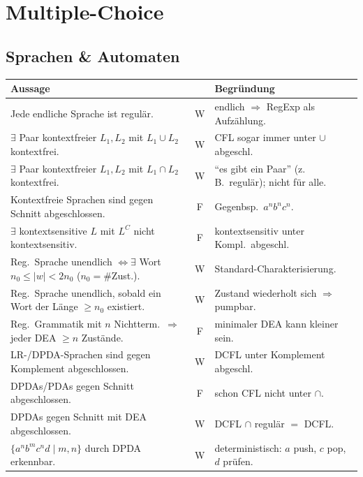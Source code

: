 \section{Multiple-Choice}\label{subsec:multiple-choice}

\subsection{Sprachen \& Automaten}
\begin{mytable}
    \begin{tabular}{@{}p{} c p{}@{}}
        \hline
        \textbf{Aussage} & \textbf{} & \textbf{Begründung}\\
        \hline
        Jede endliche Sprache ist regulär.
        & W & endlich $\Rightarrow$ RegExp als Aufzählung.\\
        $\exists$ Paar kontextfreier $L_1,L_2$ mit $L_1\cup L_2$ kontextfrei.
        & W & CFL sogar immer unter $\cup$
        abgeschl.\\
        $\exists$ Paar kontextfreier $L_1,L_2$ mit $L_1\cap L_2$ kontextfrei.
        & W & ``es gibt ein Paar'' (z.\,B.\
        regulär); nicht für alle.\\
        Kontextfreie Sprachen sind gegen Schnitt abgeschlossen.
        & F & Gegenbsp.\ $a^n b^n c^n$.\\
        $\exists$ kontextsensitive $L$ mit $L^C$ nicht kontextsensitiv.
        & F & kontextsensitiv unter Kompl.\ abgeschl.\\
        Reg.\ Sprache unendlich $\iff \exists$ Wort $n_0\le|w|<2n_0$ ($n_0=\#$Zust.). & W & Standard-Charakterisierung.\\
        Reg.\ Sprache unendlich, sobald ein Wort der Länge $\ge n_0$ existiert.
        & W & Zustand wiederholt sich $\Rightarrow$ pumpbar.\\
        Reg.\ Grammatik mit $n$ Nichtterm.\ $\Rightarrow$ jeder DEA $\ge n$ Zustände.
        & F & minimaler DEA kann kleiner sein.\\
        LR-/DPDA-Sprachen sind gegen Komplement abgeschlossen.
        & W & DCFL unter Komplement abgeschl.\\
        DPDAs/PDAs gegen Schnitt abgeschlossen.
        & F & schon CFL nicht unter $\cap$.\\
        DPDAs gegen Schnitt mit DEA abgeschlossen.
        & W & DCFL $\cap$ regulär $=$ DCFL.\\
        $\{a^n b^m c^n d\mid m,n\}$ durch DPDA erkennbar.
        & W & deterministisch: $a$ push, $c$ pop, $d$ prüfen.\\

\end{tabular}
\end{mytable}
